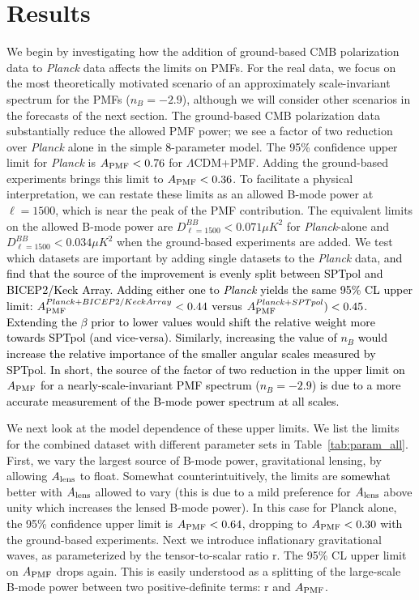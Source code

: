 \documentclass[apj]{emulateapj}
\newcommand{\apmf}{\ensuremath{A_{\rm PMF}}}
\newcommand{\alens}{\ensuremath{A_{\rm lens}}}
\newcommand{\lcdm}{\ensuremath{\Lambda}CDM}
\newcommand{\planck}{{\sl Planck}}
\newcommand{\bicepkeck}{BICEP2/Keck Array}
\newcommand{\sptpol}{SPTpol}
\newcommand{\changed}[1]{\textcolor{Black}{#1}}
\begin{document}
\section{Results}
\label{sec:results}

We begin by investigating how the addition of ground-based CMB polarization data to \planck{} data affects the limits on PMFs. 
For the real data, we focus on the most theoretically motivated scenario of an approximately scale-invariant spectrum for the PMFs ($n_B=-2.9$), although we will consider other scenarios in the forecasts of the next section. 
The ground-based CMB polarization data  substantially reduce the allowed PMF power; we see a factor of two reduction over \planck{} alone in the simple \changed{8}-parameter model. 
The 95\% confidence upper limit for \planck{} is $\apmf <  \upperAplk$ for \lcdm{}+PMF. 
Adding the ground-based experiments brings this limit to $\apmf <  \upperAall$. 
To facilitate a physical interpretation, we can restate these limits as an allowed B-mode power  at $\ell=1500$, which is near the peak of the PMF contribution. 
The equivalent limits on the allowed B-mode power are $D_{\ell=1500}^{BB} < 0.071 \mu K^2$ for \planck{}-alone and $D_{\ell=1500}^{BB} < 0.034 \mu K^2$ when the ground-based experiments are added. 
We test which datasets are important by adding single datasets to the \planck{} data, \changed{and find that the source of the improvement is evenly split between \sptpol{} and \bicepkeck{}. 
Adding either one to \planck{} yields the same 95\% CL upper limit: $\apmf^{\planck+\bicepkeck} <  \upperAbicep$ versus  $\apmf^{\planck+\sptpol}) < \upperAsptpol$. 
Extending the $\beta$ prior to lower values would shift the relative weight more towards \sptpol{} (and vice-versa). 
Similarly, increasing the value of $n_B$ would  increase the relative importance of the smaller angular scales measured by \sptpol.
In short, the source of the factor of two reduction in the upper limit on \apmf{} for a nearly-scale-invariant PMF spectrum ($n_B=-2.9$) is due to a more accurate measurement of the B-mode power spectrum at all scales. }


We next look at the model dependence of these upper limits. 
We list the limits for the combined dataset  with different parameter sets in Table~\ref{tab:param_all}. 
First, we vary the largest source of  B-mode power, gravitational lensing, by allowing \alens{} to float. 
Somewhat counterintuitively, the limits are \changed{somewhat} better with \alens{} allowed to vary (this is due to a mild preference for \alens{} above unity which increases the lensed B-mode power). 
In this case for  Planck alone, the 95\% confidence upper limit is $\apmf <  \upperAplkalens$, dropping to $\apmf <  \upperAallalens$ with the ground-based experiments. 
Next we introduce inflationary gravitational waves, as parameterized by the tensor-to-scalar ratio r. 
The 95\% CL upper limit on \apmf{} drops again.  
This is easily understood as a splitting of the large-scale B-mode power between two positive-definite terms: r and \apmf{}. 
\end{document}
